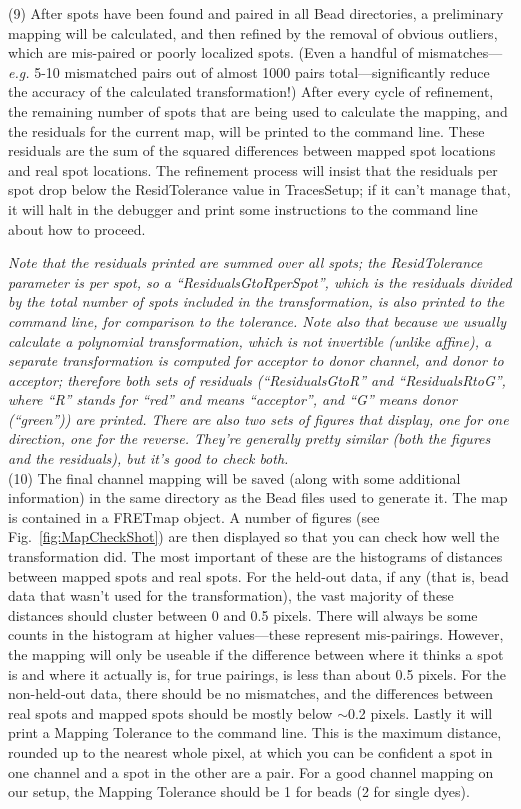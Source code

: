 \documentclass[11pt]{article}
\begin{document}
\noindent (9) After spots have been found and paired in all Bead directories, a preliminary mapping will be calculated, and then refined by the removal of obvious outliers, which are mis-paired or poorly localized spots.  (Even a handful of mismatches---{\it e.g.} 5-10 mismatched pairs out of almost 1000 pairs total---significantly reduce the accuracy of the calculated transformation!)  After every cycle of refinement, the remaining number of spots that are being used to calculate the mapping, and the residuals for the current map, will be printed to the command line.  These residuals are the sum of the squared differences between mapped spot locations and real spot locations.  The refinement process will insist that the residuals per spot drop below the ResidTolerance value in TracesSetup; if it can't manage that, it will halt in the debugger and print some instructions to the command line about how to proceed.

{\it Note that the residuals printed are summed over all spots; the ResidTolerance parameter is per spot, so a ``ResidualsGtoRperSpot'', which is the residuals divided by the total number of spots included in the transformation, is also printed to the command line, for comparison to the tolerance.  Note also that because we usually calculate a polynomial transformation, which is not invertible (unlike affine), a separate transformation is computed for acceptor to donor channel, and donor to acceptor; therefore both sets of residuals (``ResidualsGtoR'' and ``ResidualsRtoG'', where ``R'' stands for ``red'' and means ``acceptor'', and ``G'' means donor (``green'')) are printed.  There are also two sets of figures that display, one for one direction, one for the reverse.  They're generally pretty similar (both the figures and the residuals), but it's good to check both.}\\

\noindent (10) The final channel mapping will be saved (along with some additional information) in the same directory as the Bead files used to generate it. The map is contained in a FRETmap object.  A number of figures (see Fig.~\ref{fig:MapCheckShot}) are then displayed so that you can check how well the transformation did.  The most important of these are the histograms of distances between mapped spots and real spots. For the held-out data, if any (that is, bead data that wasn't used for the transformation), the vast majority of these distances should cluster between 0 and 0.5 pixels.  There will always be some counts in the histogram at higher values---these represent mis-pairings.  However, the mapping will only be useable if the difference between where it thinks a spot is and where it actually is, for true pairings, is less than about 0.5 pixels.  For the non-held-out data, there should be no mismatches, and the differences between real spots and mapped spots should be mostly below $\sim$0.2 pixels.  Lastly it will print a Mapping Tolerance to the command line.  This is the maximum distance, rounded up to the nearest whole pixel, at which you can be confident a spot in one channel and a spot in the other are a pair.  For a good channel mapping on our setup, the Mapping Tolerance should be 1 for beads (2 for single dyes).
\end{document}
